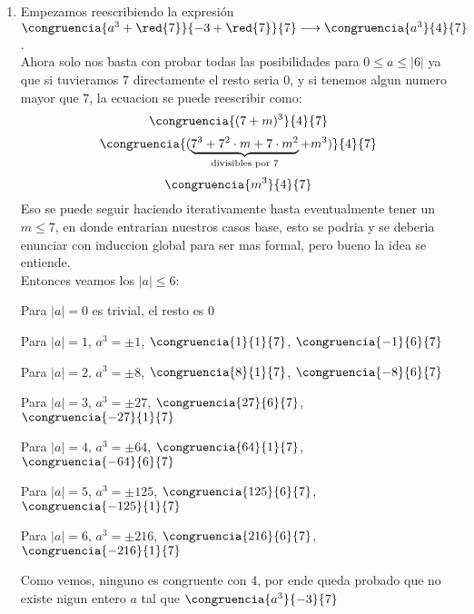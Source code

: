\begin{enumerate}[label=\alph*)]
  \item Empezamos reescribiendo la expresión $\congruencia{a^3 + \red{7}}{-3 +\red{7}}{7} \longrightarrow \congruencia{a^3}{4}{7}$. \\
        Ahora solo nos basta con probar todas las posibilidades para $ 0 \leq a \leq |6|$ ya que si tuvieramos $7$
        directamente el resto seria 0, y si tenemos algun numero mayor que $7$, la ecuacion se puede reescribir como:
        \[\congruencia{(7+m)^3}{4}{7}\]
        \[\congruencia{(\underbrace{7^3+7^2\cdot m + 7\cdot m^2}_{\text{divisibles por 7}} + m^3)}{4}{7}\]
        \[\congruencia{m^3}{4}{7}\]
        Eso se puede seguir haciendo iterativamente hasta eventualmente tener un $m \leq 7$, en donde entrarian nuestros casos base,
        esto se podria y se deberia enunciar con induccion global para ser mas formal, pero bueno la idea se entiende. \\
        Entonces veamos los $|a|\leq 6$:\\
        \begin{center}
          Para $|a| = 0$ es trivial, el resto es 0\par
          Para $|a| = 1$, $a^3 = \pm 1$, $\congruencia{1}{1}{7}$, $\congruencia{-1}{6}{7}$\par
          Para $|a| = 2$, $a^3 = \pm 8$, $\congruencia{8}{1}{7}$, $\congruencia{-8}{6}{7}$\par
          Para $|a| = 3$, $a^3 = \pm 27$, $\congruencia{27}{6}{7}$, $\congruencia{-27}{1}{7}$\par
          Para $|a| = 4$, $a^3 = \pm 64$, $\congruencia{64}{1}{7}$, $\congruencia{-64}{6}{7}$\par
          Para $|a| = 5$, $a^3 = \pm 125$, $\congruencia{125}{6}{7}$, $\congruencia{-125}{1}{7}$\par
          Para $|a| = 6$, $a^3 = \pm 216$, $\congruencia{216}{6}{7}$, $\congruencia{-216}{1}{7}$\par
        \end{center}
        Como vemos, ninguno es congruente con 4, por ende queda probado que no existe nigun entero $a$
        tal que $\congruencia{a^3}{-3}{7}$


\end{enumerate}
